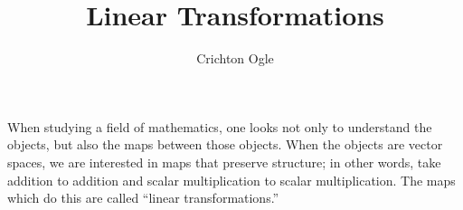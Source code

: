 \documentclass{ximera}
\title{Linear Transformations}
\author{Crichton Ogle}
\begin{document}
\begin{abstract}
\end{abstract}
\maketitle

When studying a field of mathematics, one looks not only to understand
the objects, but also the maps between those objects.  When the objects are vector spaces, we are interested in maps that preserve structure; in other words, take addition to addition and scalar multiplication to scalar multiplication. The maps which do this are called ``linear transformations.''
\end{document}
